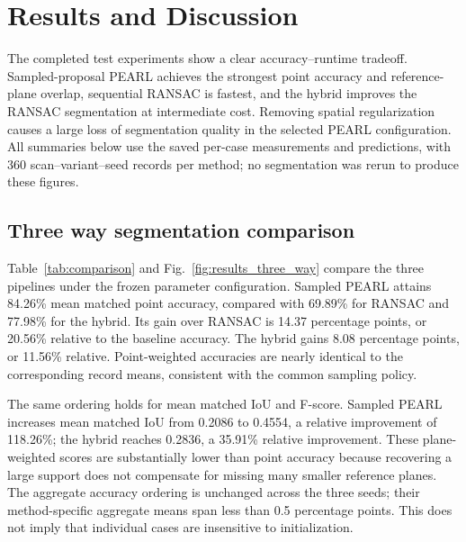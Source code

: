 \section{Results and Discussion}\label{results-and-discussion}

The completed test experiments show a clear accuracy--runtime tradeoff. Sampled-proposal PEARL achieves the strongest point accuracy and reference-plane overlap, sequential RANSAC is fastest, and the hybrid improves the RANSAC segmentation at intermediate cost. Removing spatial regularization causes a large loss of segmentation quality in the selected PEARL configuration. All summaries below use the saved per-case measurements and predictions, with 360 scan--variant--seed records per method; no segmentation was rerun to produce these figures.

\subsection{Three way segmentation comparison}\label{three-way-segmentation-comparison}

Table~\ref{tab:comparison} and Fig.~\ref{fig:results_three_way} compare the three pipelines under the frozen parameter configuration. Sampled PEARL attains 84.26\% mean matched point accuracy, compared with 69.89\% for RANSAC and 77.98\% for the hybrid. Its gain over RANSAC is 14.37 percentage points, or 20.56\% relative to the baseline accuracy. The hybrid gains 8.08 percentage points, or 11.56\% relative. Point-weighted accuracies are nearly identical to the corresponding record means, consistent with the common sampling policy.

The same ordering holds for mean matched IoU and F-score. Sampled PEARL increases mean matched IoU from 0.2086 to 0.4554, a relative improvement of 118.26\%; the hybrid reaches 0.2836, a 35.91\% relative improvement. These plane-weighted scores are substantially lower than point accuracy because recovering a large support does not compensate for missing many smaller reference planes. The aggregate accuracy ordering is unchanged across the three seeds; their method-specific aggregate means span less than 0.5 percentage points. This does not imply that individual cases are insensitive to initialization.


